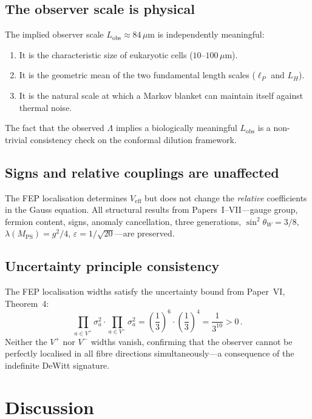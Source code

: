 \documentclass[12pt, a4paper]{article}
\theoremstyle{definition}
\theoremstyle{remark}
\newcommand{\Veff}{V_{\mathrm{eff}}}
\newcommand{\MPS}{M_{\mathrm{PS}}}
\newcommand{\Lobs}{L_{\mathrm{obs}}}
\begin{document}
\subsection{The observer scale is physical}

The implied observer scale $\Lobs \approx 84\,\mu\mathrm{m}$ is independently meaningful:
\begin{enumerate}[nosep]
\item It is the characteristic size of eukaryotic cells ($10$--$100\,\mu\mathrm{m}$).
\item It is the geometric mean of the two fundamental length scales ($\ell_P$ and $L_H$).
\item It is the natural scale at which a Markov blanket can maintain itself against thermal noise.
\end{enumerate}
The fact that the observed $\Lambda$ implies a biologically meaningful $\Lobs$ is a non-trivial consistency check on the conformal dilution framework.

\subsection{Signs and relative couplings are unaffected}

The FEP localisation determines $\Veff$ but does not change the \emph{relative} coefficients in the Gauss equation.
All structural results from Papers~I--VII---gauge group, fermion content, signs, anomaly cancellation, three generations, $\sin^2\theta_W = 3/8$, $\lambda(\MPS) = g^2/4$, $\varepsilon = 1/\sqrt{20}$---are preserved.

\subsection{Uncertainty principle consistency}

The FEP localisation widths satisfy the uncertainty bound from Paper~VI, Theorem~4:
\begin{equation}
\prod_{a \in V^+} \sigma_a^2 \cdot \prod_{a \in V^-} \sigma_a^2 = \left(\frac{1}{3}\right)^6 \cdot \left(\frac{1}{3}\right)^4 = \frac{1}{3^{10}} > 0\,.
\end{equation}
Neither the $V^+$ nor $V^-$ widths vanish, confirming that the observer cannot be perfectly localised in all fibre directions simultaneously---a consequence of the indefinite DeWitt signature.


\section{Discussion}
\label{sec:discussion}
\end{document}
